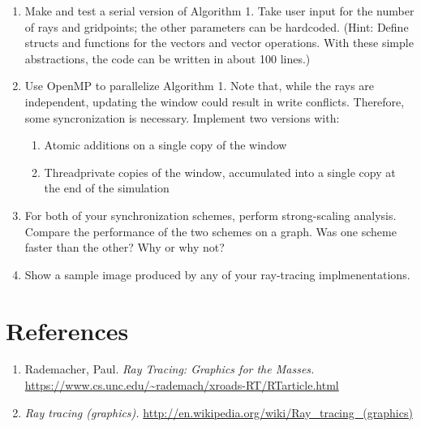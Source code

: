 \documentclass{article}
\begin{document}
\begin{enumerate}

  \item Make and test a serial version of Algorithm 1.  Take user input for the
    number of rays and gridpoints; the other parameters can be hardcoded.
    (Hint: Define structs and functions for the vectors and vector operations.
    With these simple abstractions, the code can be written in about 100
    lines.)

  \item Use OpenMP to parallelize Algorithm 1.  Note that, while the
    rays are independent, updating the window could result in write conflicts.
    Therefore, some syncronization is necessary.   Implement two versions with:
    \begin{enumerate}
      \item Atomic additions on a single copy of the window
      \item Threadprivate copies of the window, accumulated into a single
        copy at the end of the simulation
    \end{enumerate}

  \item For both of your synchronization schemes, perform strong-scaling
    analysis.  Compare the performance of the two schemes on a graph.  Was one
    scheme faster than the other?  Why or why not?

  \item Show a sample image produced by any of your ray-tracing implmenentations.

\end{enumerate}

\section{References}
\begin{enumerate}

  \item \label{ItemUNC} Rademacher, Paul.  \textit{Ray Tracing: Graphics for
    the Masses.} \url{https://www.cs.unc.edu/~rademach/xroads-RT/RTarticle.html}

  \item \label{ItemWiki} \textit{Ray tracing (graphics).}
    \url{http://en.wikipedia.org/wiki/Ray_tracing_(graphics)}

\end{enumerate}
\end{document}
